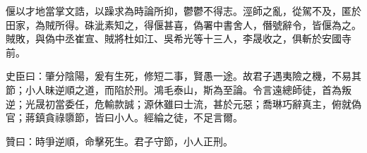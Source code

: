\begin{pinyinscope}
 偃以才地當掌文誥，以躁求為時論所抑，鬱鬱不得志。涇師之亂，從駕不及，匿於田家，為賊所得。硃泚素知之，得偃甚喜，偽署中書舍人，僭號辭令，皆偃為之。賊敗，與偽中丞崔宣、賊將杜如江、吳希光等十三人，李晟收之，俱斬於安國寺前。



 史臣曰：肇分陰陽，爰有生死，修短二事，賢愚一途。故君子遇夷險之機，不易其節；小人昧逆順之道，而陷於刑。鴻毛泰山，斯為至論。令言遠總師徒，首為叛逆；光晟初當委任，危輸款誠；源休雖曰士流，甚於元惡；喬琳巧辭真主，俯就偽官；蔣鎮貪祿隳節，皆曰小人。經綸之徒，不足言爾。



 贊曰：時爭逆順，命擊死生。君子守節，小人正刑。



\end{pinyinscope}